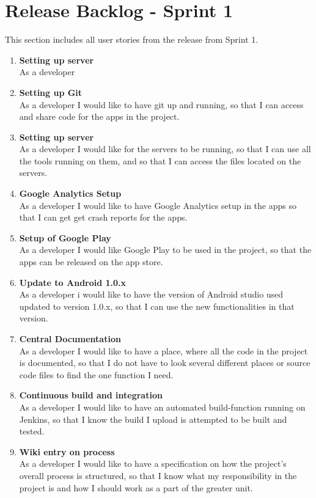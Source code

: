 \section{Release Backlog - Sprint 1}
This section includes all user stories from the release from Sprint 1.

\begin{enumerate}

\item \textbf{Setting up server}\\
As a developer

\item \textbf{Setting up Git}\\
As a developer I would like to have git up and running, so that I can access and share code for the apps in the project.

\item \textbf{Setting up server}\\
As a developer I would like for the servers to be running, so that I can use all the tools running on them, and so that I can access the files located on the servers.

\item \textbf{Google Analytics Setup}\\
As a developer I would like to have Google Analytics setup in the apps so that I can get get crash reports for the apps.

\item \textbf{Setup of Google Play}\\
As a developer I would like Google Play to be used in the project, so that the apps can be released on the app store.

\item \textbf{Update to Android 1.0.x}\\
As a developer i would like to have the version of Android studio used updated to version 1.0.x, so that I can use the new functionalities in that version.

\item \textbf{Central Documentation}\\
As a developer I would like to have a place, where all the code in the project is documented, so that I do not have to look several different places or source code files to find the one function I need.

\item \textbf{Continuous build and integration}\\
As a developer I would like to have an automated build-function running on Jenkins, so that I know the build I upload is attempted to be built and tested.

\item \textbf{Wiki entry on process}\\
As a developer I would like to have a specification on how the project’s overall process is structured, so that I know what my responsibility in the project is and how I should work as a part of the greater unit.

\end{enumerate}

